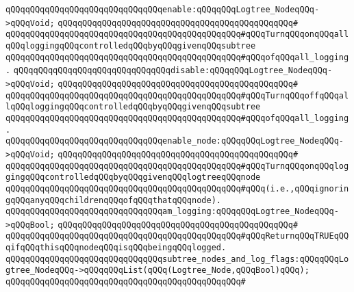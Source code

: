 \newline
\verb|qQQqqQQqqQQqqQQqqQQqqQQqqQQqqQQqenable:qQQqqQQqLogtree_NodeqQQq->qQQqVoid;|\newline
\verb|qQQqqQQqqQQqqQQqqQQqqQQqqQQqqQQqqQQqqQQqqQQqqQQq#|\newline
\verb|qQQqqQQqqQQqqQQqqQQqqQQqqQQqqQQqqQQqqQQqqQQqqQQq#qQQqTurnqQQqonqQQqallqQQqloggingqQQqcontrolledqQQqbyqQQqgivenqQQqsubtree|\newline
\verb|qQQqqQQqqQQqqQQqqQQqqQQqqQQqqQQqqQQqqQQqqQQqqQQq#qQQqofqQQqall_logging.|\newline
\newline
\verb|qQQqqQQqqQQqqQQqqQQqqQQqqQQqqQQqdisable:qQQqqQQqLogtree_NodeqQQq->qQQqVoid;|\newline
\verb|qQQqqQQqqQQqqQQqqQQqqQQqqQQqqQQqqQQqqQQqqQQqqQQq#|\newline
\verb|qQQqqQQqqQQqqQQqqQQqqQQqqQQqqQQqqQQqqQQqqQQqqQQq#qQQqTurnqQQqoffqQQqallqQQqloggingqQQqcontrolledqQQqbyqQQqgivenqQQqsubtree|\newline
\verb|qQQqqQQqqQQqqQQqqQQqqQQqqQQqqQQqqQQqqQQqqQQqqQQq#qQQqofqQQqall_logging.|\newline
\newline
\verb|qQQqqQQqqQQqqQQqqQQqqQQqqQQqqQQqenable_node:qQQqqQQqLogtree_NodeqQQq->qQQqVoid;|\newline
\verb|qQQqqQQqqQQqqQQqqQQqqQQqqQQqqQQqqQQqqQQqqQQqqQQq#|\newline
\verb|qQQqqQQqqQQqqQQqqQQqqQQqqQQqqQQqqQQqqQQqqQQqqQQq#qQQqTurnqQQqonqQQqloggingqQQqcontrolledqQQqbyqQQqgivenqQQqlogtreeqQQqnode|\newline
\verb|qQQqqQQqqQQqqQQqqQQqqQQqqQQqqQQqqQQqqQQqqQQqqQQq#qQQq(i.e.,qQQqignoringqQQqanyqQQqchildrenqQQqofqQQqthatqQQqnode).|\newline
\newline
\verb|qQQqqQQqqQQqqQQqqQQqqQQqqQQqqQQqam_logging:qQQqqQQqLogtree_NodeqQQq->qQQqBool;|\newline
\verb|qQQqqQQqqQQqqQQqqQQqqQQqqQQqqQQqqQQqqQQqqQQqqQQq#|\newline
\verb|qQQqqQQqqQQqqQQqqQQqqQQqqQQqqQQqqQQqqQQqqQQqqQQq#qQQqReturnqQQqTRUEqQQqifqQQqthisqQQqnodeqQQqisqQQqbeingqQQqlogged.|\newline
\newline
\verb|qQQqqQQqqQQqqQQqqQQqqQQqqQQqqQQqsubtree_nodes_and_log_flags:qQQqqQQqLogtree_NodeqQQq->qQQqqQQqList(qQQq(Logtree_Node,qQQqBool)qQQq);|\newline
\verb|qQQqqQQqqQQqqQQqqQQqqQQqqQQqqQQqqQQqqQQqqQQqqQQq#|\newline
